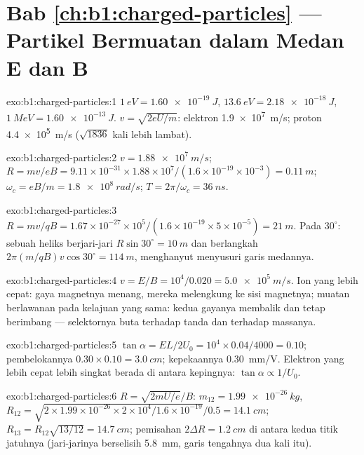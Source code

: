 \section*{Bab \ref{ch:b1:charged-particles} --- Partikel Bermuatan dalam Medan E dan B}

\begin{solution}{exo:b1:charged-particles:1}
$\qty{1}{eV} = \qty{1.60e-19}{J}$, $\qty{13.6}{eV} = \qty{2.18e-18}{J}$,
$\qty{1}{MeV} = \qty{1.60e-13}{J}$. $v = \sqrt{2eU/m}$: elektron
\qty{1.9e7}{m/s}; proton \qty{4.4e5}{m/s} ($\sqrt{1836}$ kali lebih lambat).
\end{solution}

\begin{solution}{exo:b1:charged-particles:2}
$v = \qty{1.88e7}{m/s}$; $R = mv/eB = 9.11\times10^{-31} \times 1.88\times10^7/
(1.6\times10^{-19} \times 10^{-3}) = \qty{0.11}{m}$; $\omega_c = eB/m =
\qty{1.8e8}{rad/s}$; $T = 2\pi/\omega_c = \qty{36}{ns}$.
\end{solution}

\begin{solution}{exo:b1:charged-particles:3}
$R = mv/qB = 1.67\times10^{-27} \times 10^5/(1.6\times10^{-19} \times 5\times
10^{-5}) = \qty{21}{m}$. Pada $30^\circ$: sebuah heliks berjari-jari $R\sin 30^\circ
= \qty{10}{m}$ dan berlangkah $2\pi(m/qB)v\cos 30^\circ = \qty{114}{m}$, menghanyut
menyusuri garis medannya.
\end{solution}

\begin{solution}{exo:b1:charged-particles:4}
$v = E/B = 10^4/0.020 = \qty{5.0e5}{m/s}$. Ion yang lebih cepat: gaya magnetnya
menang, mereka melengkung ke sisi magnetnya; muatan berlawanan pada
kelajuan yang sama: kedua gayanya membalik dan tetap berimbang --- selektornya
buta terhadap tanda dan terhadap massanya.
\end{solution}

\begin{solution}{exo:b1:charged-particles:5}
$\tan\alpha = EL/2U_0 = 10^4 \times 0.04/4000 = 0.10$; pembelokannya
$0.30 \times 0.10 = \qty{3.0}{cm}$; kepekaannya \qty{0.30}{mm/V}. Elektron yang
lebih cepat lebih singkat berada di antara kepingnya: $\tan\alpha \propto 1/U_0$.
\end{solution}

\begin{solution}{exo:b1:charged-particles:6}
$R = \sqrt{2mU/e}/B$: $m_{12} = \qty{1.99e-26}{kg}$, $R_{12} = \sqrt{2 \times
1.99\times10^{-26} \times 2\times10^4/1.6\times10^{-19}}/0.5 = \qty{14.1}{cm}$;
$R_{13} = R_{12}\sqrt{13/12} = \qty{14.7}{cm}$; pemisahan $2\Delta R =
\qty{1.2}{cm}$ di antara kedua titik jatuhnya (jari-jarinya berselisih \qty{5.8}{mm},
garis tengahnya dua kali itu).
\end{solution}

